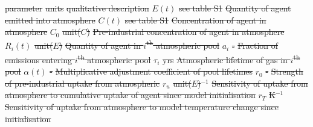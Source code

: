 \documentclass[gmd, manuscript]{copernicus}
\providecommand{\DIFdel}[1]{{\protect\color{red}\sout{#1}}}                      %
\providecommand{\DIFdelbegin}{} %
\begin{document}
\clearpage
%
\DIFdelbegin %
\DIFdel{parameter }%
\DIFdel{units }%
\DIFdel{qualitative description}%
\DIFdel{$E(t)$ }%
\DIFdel{see table S1 }%
\DIFdel{Quantity of agent emitted into atmosphere}%
\DIFdel{$C(t)$ }%
\DIFdel{see table S1 }%
\DIFdel{Concentration of agent in atmosphere}%
\DIFdel{$C_0$ }%
\DIFdel{unit($C$) }%
\DIFdel{Pre-industrial concentration of agent in atmosphere}%
\DIFdel{$R_i(t)$ }%
\DIFdel{unit($E$) }%
\DIFdel{Quantity of agent in $i$\textsuperscript{th} atmospheric pool}%
\DIFdel{$a_i$ }%
\DIFdel{- }%
\DIFdel{Fraction of emissions entering $i$\textsuperscript{th} atmospheric pool}%
\DIFdel{$\tau_i$ }%
\DIFdel{yrs }%
\DIFdel{Atmospheric lifetime of gas in $i$\textsuperscript{th} pool}%
\DIFdel{$\alpha(t)$ }%
\DIFdel{- }%
\DIFdel{Multiplicative adjustment coefficient of pool lifetimes}%
\DIFdel{$r_0$ }%
\DIFdel{- }%
\DIFdel{Strength of pre-industrial uptake from atmospheric}%
\DIFdel{$r_u$ }%
\DIFdel{unit($E$)$^{-1}$ }%
\DIFdel{Sensitivity of uptake from atmosphere to cumulative uptake of agent since model initialisation}%
\DIFdel{$r_T$ }%
\DIFdel{K$^{-1}$ }%
\DIFdel{Sensitivity of uptake from atmosphere to model temperature change since initialisation}%
\end{document}

